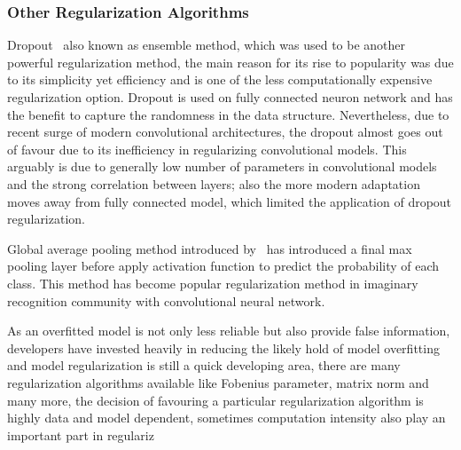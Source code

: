 \subsubsection{Other Regularization Algorithms}

Dropout~\cite{JMLR:v15:srivastava14a} also known as ensemble method, which was used to be another powerful regularization method, the main reason for its rise to popularity was due to its simplicity yet efficiency and is one of the less computationally expensive regularization option. Dropout is used on fully connected neuron network and has the benefit to capture the randomness in the data structure. Nevertheless, due to recent surge of modern convolutional architectures, the dropout almost goes out of favour due to its inefficiency in regularizing convolutional models. This arguably is due to generally low number of parameters in convolutional models and the strong correlation between layers; also the more modern adaptation moves away from fully connected model, which limited the application of dropout regularization. 
\par 
Global average pooling method introduced by~\citet{LinCY13} has introduced a final max pooling layer before apply activation function to predict the probability of each class. This method has become popular regularization method in imaginary recognition community with convolutional neural network. 
\par 
As an overfitted model is not only less reliable but also provide false information, developers have invested heavily in reducing the likely hold of model overfitting and model regularization is still a quick developing area, there are many regularization algorithms available like Fobenius parameter, matrix norm and many more, the decision of favouring a particular regularization algorithm is highly data and model dependent, sometimes computation intensity also play an important part in regulariz